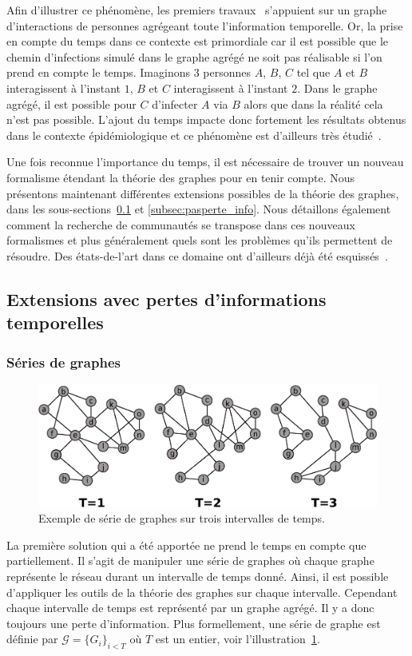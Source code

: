 Afin d'illustrer ce phénomène, les premiers travaux~\cite{Vespignani2008}
s'appuient sur un graphe d'interactions de personnes agrégeant toute l'information temporelle.
Or, la prise en compte du temps dans ce contexte est primordiale car il est possible que le chemin d'infections simulé dans le graphe agrégé ne soit pas réalisable si l'on prend en compte le temps.
Imaginons 3 personnes $A$, $B$, $C$ tel que $A$ et $B$ interagissent à l'instant $1$, $B$ et $C$ interagissent à l'instant $2$.
Dans le graphe agrégé, il est possible pour $C$ d'infecter $A$ via $B$ alors que dans la réalité cela n'est pas possible.
L'ajout du temps impacte donc fortement les résultats obtenus dans le contexte épidémiologique et ce phénomène est d'ailleurs très étudié~\cite{Gauvin2015a,Karsai2011,Jo2014,Horvath2014,Holme2014a,Scholtes2014,Perotti2014a}.

Une fois reconnue l'importance du temps, il est nécessaire de trouver un nouveau formalisme étendant la théorie des graphes pour en tenir compte.
Nous présentons maintenant différentes extensions possibles de la théorie des graphes, dans les sous-sections~\ref{subsec:perte_info} et \ref{subsec:pasperte_info}.
Nous détaillons également comment la recherche de communautés se transpose dans ces nouveaux formalismes et plus généralement quels sont les problèmes qu'ils permettent de résoudre.
Des états-de-l'art dans ce domaine ont d'ailleurs déjà été esquissés~\cite{Boccaletti2014,Cazabet2014,hartmann2014clustering}.

\subsection{Extensions avec pertes d'informations temporelles}
\label{subsec:perte_info}
\subsubsection{Séries de graphes}
\begin{figure}[h]
\centering
\includegraphics[width=0.8\linewidth]{img/Intro/TVG.eps}
\caption{Exemple de série de graphes sur trois intervalles de temps.}
\label{fig:exemple_TVG}
\end{figure}
La première solution qui a été apportée ne prend le temps en compte que partiellement.
Il s'agit de manipuler une série de graphes où chaque graphe représente le réseau durant un intervalle de temps donné.
Ainsi, il est possible d'appliquer les outils de la théorie des graphes sur chaque intervalle.
Cependant chaque intervalle de temps est représenté par un graphe agrégé.
Il y a donc toujours une perte d'information.
Plus formellement, une série de graphe est définie par $\mathcal{G}=\{G_i\}_{i < T}$ où $T$ est un entier, voir l'illustration~\ref{fig:exemple_TVG}.


